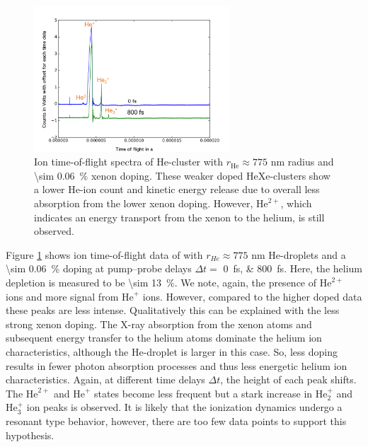 \begin{figure}
 	\centering
 		\includegraphics[width=0.65\textwidth]{images/results/TOF-helium-xenon-cluster-13.png}
 	\caption[TOF spectra of HeXe-clusters with \SI{\sim 0.06}{\percent} Xe-doping at various delays.]{Ion time-of-flight spectra of He-cluster with $r_{\text{He}}\approx 775$ nm radius and \SI{\sim 0.06}{\percent} xenon doping. These weaker doped HeXe-clusters show a lower He-ion count and kinetic energy release due to overall less absorption from the lower xenon doping. However, $\text{He}^{2+}$, which indicates an energy transport from the xenon to the helium, is still observed.}
 	\label{fig:TOF-helium-xenon-cluster-13}
\end{figure}
Figure \ref{fig:TOF-helium-xenon-cluster-13} shows ion time-of-flight data of with $r_{He}\approx 775$ nm He-droplets and a \SI{\sim 0.06}{\percent} doping at pump--probe delays $\Delta t=$ \SIlist{0;800}{\femto\second}. Here, the helium depletion is measured to be \SI{\sim 13}{\percent}. We note, again, the presence of $\text{He}^{2+}$ ions and more signal from $\text{He}^{+}$ ions. However, compared to the higher doped data these peaks are less intense. Qualitatively this can be explained with the less strong xenon doping. The X-ray absorption from the xenon atoms and subsequent energy transfer to the helium atoms dominate the helium ion characteristics, although the He-droplet is larger in this case. So, less doping results in fewer photon absorption processes and thus less energetic helium ion characteristics. Again, at different time delays $\Delta t$, the height of each peak shifts. The $\text{He}^{2+}$ and $\text{He}^{+}$ states become less frequent but a stark increase in $\text{He}_{2}^{+}$ and $\text{He}_{3}^{+}$ ion peaks is observed. It is likely that the ionization dynamics undergo a resonant type behavior, however, there are too few data points to support this hypothesis.\\[1\baselineskip]
